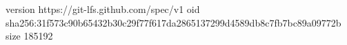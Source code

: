 version https://git-lfs.github.com/spec/v1
oid sha256:31f573c90b65432b30c29f77f617da2865137299d4589db8c7fb7bc89a09772b
size 185192
